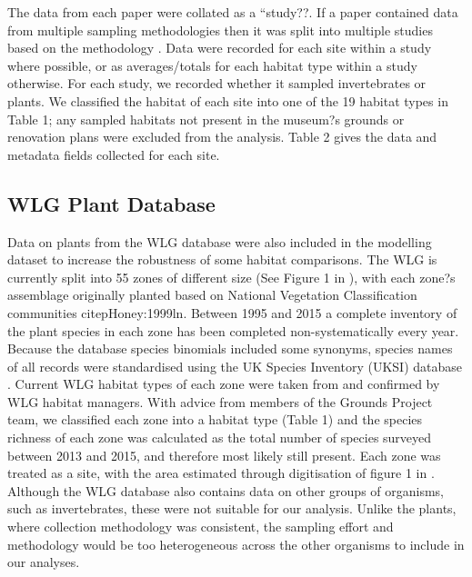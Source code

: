 The data from each paper were collated as a ``study??. If a paper contained data from multiple sampling methodologies then it was split into multiple studies based on the methodology \citep[following][]{Hudson:2014predicts}. Data were recorded for each site within a study where possible, or as averages/totals for each habitat type within a study otherwise. For each study, we recorded whether it sampled invertebrates or plants. We classified the habitat of each site into one of the 19 habitat types in Table 1; any sampled habitats not present in the museum?s grounds or renovation plans were excluded from the analysis. Table 2 gives the data and metadata fields collected for each site.

\subsection{WLG Plant Database}
Data on plants from the WLG database were also included in the modelling dataset to increase the robustness of some habitat comparisons. The WLG is currently split into 55 zones of different size (See Figure 1 in \citealt{Leigh:2003ln}), with each zone?s assemblage originally planted based on National Vegetation Classification communities citep{Honey:1999ln}. Between 1995 and 2015 a complete inventory of the plant species in each zone has been completed non-systematically every year. Because the database species binomials included some synonyms, species names of all records were standardised using the UK Species Inventory (UKSI) database \citep{Raper:2014wg}. Current WLG habitat types of each zone were taken from \citep{Leigh:2003ln} and confirmed by WLG habitat managers. With advice from members of the Grounds Project team, we classified each zone into a habitat type (Table 1) and the species richness of each zone was calculated as the total number of species surveyed between 2013 and 2015, and therefore most likely still present. Each zone was treated as a site, with the area estimated through digitisation of figure 1 in \cite{Leigh:2003ln}. Although the WLG database also contains data on other groups of organisms, such as invertebrates, these were not suitable for our analysis. Unlike the plants, where collection methodology was consistent, the sampling effort and methodology would be too heterogeneous across the other organisms to include in our analyses.

